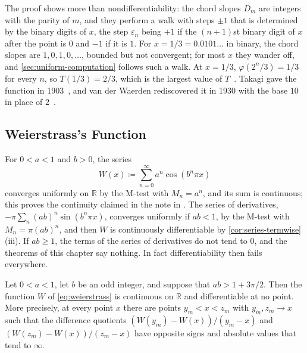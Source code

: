 The proof shows more than nondifferentiability: the chord slopes $D_m$ are integers with the parity of $m$, and they perform a walk with steps $\pm1$ that is determined by the binary digits of $x$, the step $\varepsilon_n$ being $+1$ if the $(n+1)$st binary digit of $x$ after the point is $0$ and $-1$ if it is $1$. For $x=1/3=0.0101\ldots$ in binary, the chord slopes are $1,0,1,0,\ldots$, bounded but not convergent; for most $x$ they wander off, and \cref{sec:uniform-computation} follows such a walk. At $x=1/3$, $\varphi(2^n/3)=1/3$ for every $n$, so $T(1/3)=2/3$, which is the largest value of $T$~\cite{allaart2012}. Takagi gave the function in 1903~\cite{takagi1903}, and van der Waerden rediscovered it in 1930 with the base $10$ in place of $2$~\cite{vanderwaerden1930}.

\subsection{Weierstrass's Function}

For $0<a<1$ and $b>0$, the series
\begin{equation}
W(x)\coloneqq\sum_{n=0}^\infty a^n\cos(b^n\pi x)
\label{eq:weierstrass}
\end{equation}
converges uniformly on $\mathbb R$ by the M-test with $M_n=a^n$, and its sum is continuous; this proves the continuity claimed in the note in . The series of derivatives, $-\pi\sum_n(ab)^n\sin(b^n\pi x)$, converges uniformly if $ab<1$, by the M-test with $M_n=\pi(ab)^n$, and then $W$ is continuously differentiable by \cref{cor:series-termwise}\,(iii). If $ab\ge1$, the terms of the series of derivatives do not tend to $0$, and the theorems of this chapter say nothing. In fact differentiability then fails everywhere.

\begin{theorem}[Weierstrass]
\label{thm:weierstrass-function}
Let $0<a<1$, let $b$ be an odd integer, and suppose that $ab>1+3\pi/2$. Then the function $W$ of \eqref{eq:weierstrass} is continuous on $\mathbb R$ and differentiable at no point. More precisely, at every point $x$ there are points $y_m<x<z_m$ with $y_m,z_m\to x$ such that the difference quotients $(W(y_m)-W(x))/(y_m-x)$ and $(W(z_m)-W(x))/(z_m-x)$ have opposite signs and absolute values that tend to $\infty$.
\end{theorem}

